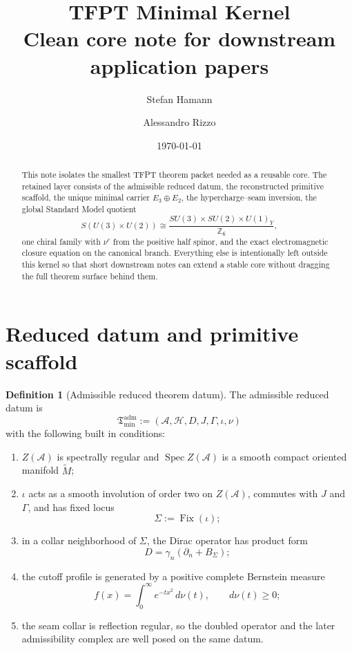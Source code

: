 \documentclass[11pt,a4paper]{article}
\title{\textbf{TFPT Minimal Kernel}\\\large Clean core note for downstream application papers}
\author{Stefan Hamann \and Alessandro Rizzo}
\date{\today}
\theoremstyle{definition}
\newtheorem{definition}[theorem]{Definition}
\theoremstyle{remark}
\DeclareMathOperator{\Spec}{Spec}
\DeclareMathOperator{\Fix}{Fix}
\newcommand{\Seam}{\Sigma}
\newcommand{\inv}{\iota}
\newcommand{\Tmin}{\mathfrak T_{\mathrm{min}}}
\numberwithin{equation}{section}
\begin{document}
\maketitle

\begin{abstract}
This note isolates the smallest TFPT theorem packet needed as a reusable core.
The retained layer consists of the admissible reduced datum, the reconstructed primitive scaffold,
the unique minimal carrier $E_3 \oplus E_2$, the hypercharge--seam inversion,
the global Standard Model quotient
\[
S(U(3)\times U(2)) \cong \frac{SU(3)\times SU(2)\times U(1)_Y}{\mathbb Z_6},
\]
one chiral family with $\nu^c$ from the positive half spinor, and the exact electromagnetic
closure equation on the canonical branch. Everything else is intentionally left outside this
kernel so that short downstream notes can extend a stable core without dragging the full theorem
surface behind them.
\end{abstract}

\tableofcontents

\section{Reduced datum and primitive scaffold}

\begin{definition}[Admissible reduced theorem datum]
\label{def:reduced-datum}
The admissible reduced datum is
\[
\Tmin^{\mathrm{adm}} := (\mathcal A,\mathcal H,D,J,\Gamma,\inv,\nu)
\]
with the following built in conditions:
\begin{enumerate}[label=(\roman*), leftmargin=1.6em, itemsep=0.25em]
    \item $Z(\mathcal A)$ is spectrally regular and $\Spec Z(\mathcal A)$ is a smooth compact oriented manifold $\widetilde M$;
    \item $\inv$ acts as a smooth involution of order two on $Z(\mathcal A)$, commutes with $J$ and $\Gamma$, and has fixed locus
    \[
    \Seam := \Fix(\inv);
    \]
    \item in a collar neighborhood of $\Seam$, the Dirac operator has product form
    \[
    D = \gamma_n(\partial_n + B_{\Seam});
    \]
    \item the cutoff profile is generated by a positive complete Bernstein measure
    \[
    f(x) = \int_0^\infty e^{-t x^2}\,d\nu(t),
    \qquad
    d\nu(t)\ge 0;
    \]
    \item the seam collar is reflection regular, so the doubled operator and the later admissibility complex are well posed on the same datum.
\end{enumerate}
\end{definition}
\end{document}

